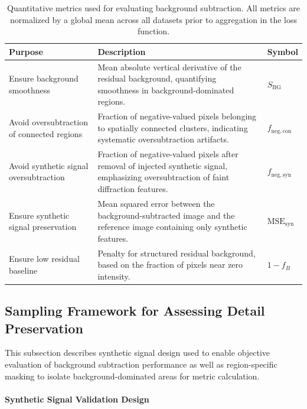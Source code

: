 \documentclass[iucr]{iucrjournals}
\begin{document}
\begin{table}[t]
\caption{Quantitative metrics used for evaluating background subtraction. 
All metrics are normalized by a global mean across all datasets prior to aggregation in the loss function.}
\label{tab:loss_terms}
\centering
\small
\setlength{\tabcolsep}{6pt}
\renewcommand{\arraystretch}{1.1}
\begin{tabular}{@{}p{3.5cm}p{9.0cm}p{1.5cm}@{}}
\toprule
\textbf{Purpose} & \textbf{Description} & \textbf{Symbol} \\
\midrule
Ensure background smoothness  & Mean absolute vertical derivative of the residual background, quantifying smoothness in background-dominated regions. & $S_{\mathrm{BG}}$ \\
Avoid oversubtraction of connected regions & Fraction of negative-valued pixels belonging to spatially connected clusters, indicating systematic oversubtraction artifacts. & $f_{\mathrm{neg,con}}$ \\
Avoid synthetic signal oversubtraction & Fraction of negative-valued pixels after removal of injected synthetic signal, emphasizing oversubtraction of faint diffraction features. & $f_{\mathrm{neg,syn}}$ \\
Ensure synthetic signal preservation & Mean squared error between the background-subtracted image and the reference image containing only synthetic features.& $\mathrm{MSE}_{\mathrm{syn}}$  \\
Ensure low residual baseline & Penalty for structured residual background, based on the fraction of pixels near zero intensity. & $1 - f_{B}$ \\
\bottomrule
\end{tabular}
\end{table}




\subsection{Sampling Framework for Assessing Detail Preservation}

This subsection describes synthetic signal design used to enable objective evaluation of background subtraction performance as well as region-specific masking to isolate background-dominated areas for metric calculation.

\paragraph{Synthetic Signal Validation Design}
\end{document}

